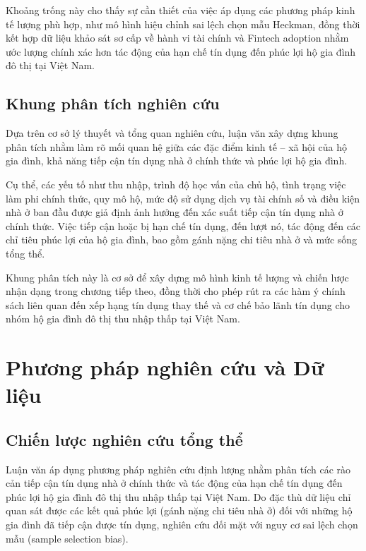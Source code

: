 \documentclass[12pt,a4paper]{report}
\begin{document}
	Khoảng trống này cho thấy sự cần thiết của việc áp dụng các phương pháp kinh tế lượng phù hợp, như mô hình hiệu chỉnh sai lệch chọn mẫu Heckman, đồng thời kết hợp dữ liệu khảo sát sơ cấp về hành vi tài chính và Fintech adoption nhằm ước lượng chính xác hơn tác động của hạn chế tín dụng đến phúc lợi hộ gia đình đô thị tại Việt Nam.
	
	\section{Khung phân tích nghiên cứu}
	
	Dựa trên cơ sở lý thuyết và tổng quan nghiên cứu, luận văn xây dựng khung phân tích nhằm làm rõ mối quan hệ giữa các đặc điểm kinh tế – xã hội của hộ gia đình, khả năng tiếp cận tín dụng nhà ở chính thức và phúc lợi hộ gia đình.
	
	Cụ thể, các yếu tố như thu nhập, trình độ học vấn của chủ hộ, tình trạng việc làm phi chính thức, quy mô hộ, mức độ sử dụng dịch vụ tài chính số và điều kiện nhà ở ban đầu được giả định ảnh hưởng đến xác suất tiếp cận tín dụng nhà ở chính thức. Việc tiếp cận hoặc bị hạn chế tín dụng, đến lượt nó, tác động đến các chỉ tiêu phúc lợi của hộ gia đình, bao gồm gánh nặng chi tiêu nhà ở và mức sống tổng thể.
	
	Khung phân tích này là cơ sở để xây dựng mô hình kinh tế lượng và chiến lược nhận dạng trong chương tiếp theo, đồng thời cho phép rút ra các hàm ý chính sách liên quan đến xếp hạng tín dụng thay thế và cơ chế bảo lãnh tín dụng cho nhóm hộ gia đình đô thị thu nhập thấp tại Việt Nam.
		
	\chapter{Phương pháp nghiên cứu và Dữ liệu}
	
	\section{Chiến lược nghiên cứu tổng thể}
	
	Luận văn áp dụng phương pháp nghiên cứu định lượng nhằm phân tích các rào cản tiếp cận tín dụng nhà ở chính thức và tác động của hạn chế tín dụng đến phúc lợi hộ gia đình đô thị thu nhập thấp tại Việt Nam. Do đặc thù dữ liệu chỉ quan sát được các kết quả phúc lợi (gánh nặng chi tiêu nhà ở) đối với những hộ gia đình đã tiếp cận được tín dụng, nghiên cứu đối mặt với nguy cơ sai lệch chọn mẫu (sample selection bias).
	
\end{document}
